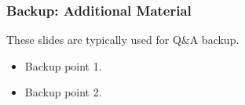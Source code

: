 \begin{frame}
    \frametitle{Backup: Additional Material}
    These slides are typically used for Q\&A backup.
    \begin{itemize}
        \item Backup point 1.
        \item Backup point 2.
    \end{itemize}
\end{frame}